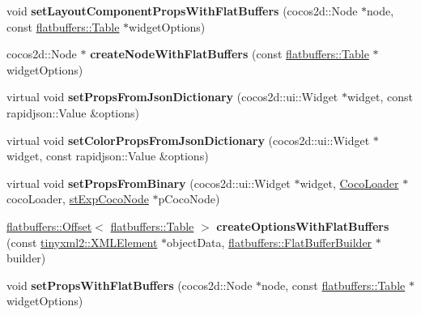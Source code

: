 \begin{DoxyCompactItemize}
void {\bfseries set\+Layout\+Component\+Props\+With\+Flat\+Buffers} (cocos2d\+::\+Node $\ast$node, const \hyperlink{classflatbuffers_1_1Table}{flatbuffers\+::\+Table} $\ast$widget\+Options)
\item 
\mbox{\label{classcocostudio_1_1WidgetReader_a86ca212f26c011b1dd9f23021fa46628}} 
cocos2d\+::\+Node $\ast$ {\bfseries create\+Node\+With\+Flat\+Buffers} (const \hyperlink{classflatbuffers_1_1Table}{flatbuffers\+::\+Table} $\ast$widget\+Options)
\item 
\mbox{\label{classcocostudio_1_1WidgetReader_a3815339ed565102e125af02f8e6b840c}} 
virtual void {\bfseries set\+Props\+From\+Json\+Dictionary} (cocos2d\+::ui\+::\+Widget $\ast$widget, const rapidjson\+::\+Value \&options)
\item 
\mbox{\label{classcocostudio_1_1WidgetReader_a93d73f2e6e0d11477645a2528bf7ded0}} 
virtual void {\bfseries set\+Color\+Props\+From\+Json\+Dictionary} (cocos2d\+::ui\+::\+Widget $\ast$widget, const rapidjson\+::\+Value \&options)
\item 
\mbox{\label{classcocostudio_1_1WidgetReader_a00848627db81b24e1c89d778714cfc34}} 
virtual void {\bfseries set\+Props\+From\+Binary} (cocos2d\+::ui\+::\+Widget $\ast$widget, \hyperlink{classcocostudio_1_1CocoLoader}{Coco\+Loader} $\ast$coco\+Loader, \hyperlink{structcocostudio_1_1stExpCocoNode}{st\+Exp\+Coco\+Node} $\ast$p\+Coco\+Node)
\item 
\mbox{\label{classcocostudio_1_1WidgetReader_a86896e8636d97fe8bf48123cdff1c673}} 
\hyperlink{structflatbuffers_1_1Offset}{flatbuffers\+::\+Offset}$<$ \hyperlink{classflatbuffers_1_1Table}{flatbuffers\+::\+Table} $>$ {\bfseries create\+Options\+With\+Flat\+Buffers} (const \hyperlink{classtinyxml2_1_1XMLElement}{tinyxml2\+::\+X\+M\+L\+Element} $\ast$object\+Data, \hyperlink{classflatbuffers_1_1FlatBufferBuilder}{flatbuffers\+::\+Flat\+Buffer\+Builder} $\ast$builder)
\item 
\mbox{\label{classcocostudio_1_1WidgetReader_af19ca435256596a00b10f43ea3badf30}} 
void {\bfseries set\+Props\+With\+Flat\+Buffers} (cocos2d\+::\+Node $\ast$node, const \hyperlink{classflatbuffers_1_1Table}{flatbuffers\+::\+Table} $\ast$widget\+Options)

\end{DoxyCompactItemize}
